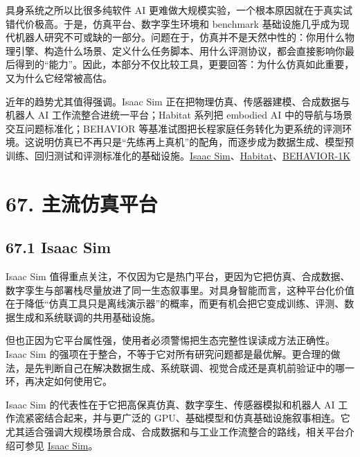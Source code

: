 

具身系统之所以比很多纯软件 AI 更难做大规模实验，一个根本原因就在于真实试错代价极高。于是，仿真平台、数字孪生环境和 benchmark 基础设施几乎成为现代机器人研究不可或缺的一部分。问题在于，仿真并不是天然中性的：你用什么物理引擎、构造什么场景、定义什么任务脚本、用什么评测协议，都会直接影响你最后得到的“能力”。因此，本部分不仅比较工具，更要回答：为什么仿真如此重要，又为什么它经常被高估。

近年的趋势尤其值得强调。Isaac Sim 正在把物理仿真、传感器建模、合成数据与机器人 AI 工作流整合进统一平台；Habitat 系列把 embodied AI 中的导航与场景交互问题标准化；BEHAVIOR 等基准试图把长程家庭任务转化为更系统的评测环境。这说明仿真已不再只是“先练再上真机”的配角，而逐步成为数据生成、模型预训练、回归测试和评测标准化的基础设施。\href{https://developer.nvidia.com/isaac/sim}{Isaac Sim}、\href{https://aihabitat.org/}{Habitat}、\href{https://behavior.stanford.edu/behavior-1k}{BEHAVIOR-1K}

\section*{67. 主流仿真平台}

\subsection*{67.1 Isaac Sim}


Isaac Sim 值得重点关注，不仅因为它是热门平台，更因为它把仿真、合成数据、数字孪生与部署栈尽量放进了同一生态叙事里。对具身智能而言，这种平台化价值在于降低“仿真工具只是离线演示器”的概率，而更有机会把它变成训练、评测、数据生成和系统联调的共用基础设施。

但也正因为它平台属性强，使用者必须警惕把生态完整性误读成方法正确性。Isaac Sim 的强项在于整合，不等于它对所有研究问题都是最优解。更合理的做法，是先判断自己在解决数据生成、系统联调、视觉合成还是真机前验证中的哪一环，再决定如何使用它。

Isaac Sim 的代表性在于它把高保真仿真、数字孪生、传感器模拟和机器人 AI 工作流紧密结合起来，并与更广泛的 GPU、基础模型和仿真基础设施叙事相连。它尤其适合强调大规模场景合成、合成数据和与工业工作流整合的路线，相关平台介绍可参见 \href{https://developer.nvidia.com/isaac/sim}{Isaac Sim}。

